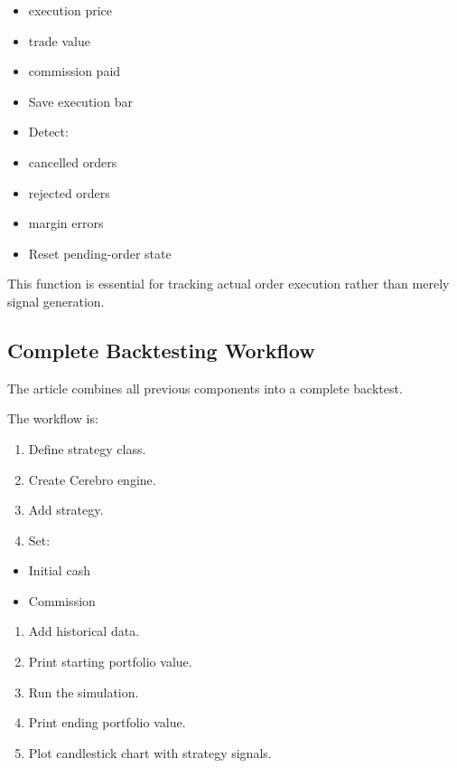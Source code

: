 \documentclass[12pt,openany]{book}
\begin{document}
\begin{itemize}[leftmargin=*]
    \item execution price
    \item trade value
    \item commission paid
    \item Save execution bar
    \item Detect:
\end{itemize}

\begin{itemize}[leftmargin=*]
    \item cancelled orders
    \item rejected orders
    \item margin errors
    \item Reset pending-order state
\end{itemize}

This function is essential for tracking actual order execution rather than merely signal generation.

\subsection{Complete Backtesting Workflow}

The article combines all previous components into a complete backtest.

The workflow is:

\begin{enumerate}[leftmargin=*]
    \item Define strategy class.
    \item Create Cerebro engine.
    \item Add strategy.
    \item Set:
\end{enumerate}

\begin{itemize}[leftmargin=*]
    \item Initial cash
    \item Commission
\end{itemize}
\begin{enumerate}[leftmargin=*]
    \item Add historical data.
    \item Print starting portfolio value.
    \item Run the simulation.
    \item Print ending portfolio value.
    \item Plot candlestick chart with strategy signals.
\end{enumerate}
\end{document}
